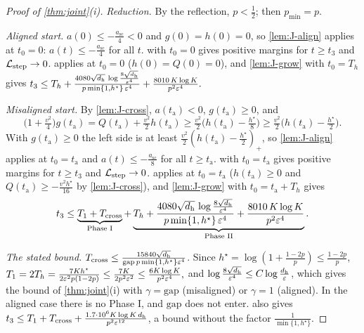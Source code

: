 \begin{proof}[Proof of \cref{thm:joint}(i)]
\emph{Reduction.} By the reflection, $p<\frac{1}{2}$; then $p_{\min}=p$.

\emph{Aligned start.} $a(0)\le-\frac{a_{\mathrm{sc}}}{4}<0$ and $g(0)=h(0)=0$, so \cref{lem:J-align} applies at $t_0=0$: $a(t)\le-\frac{a_{\mathrm{sc}}}{4}$ for all $t$.
 with $t_0=0$ gives positive margins for $t\ge t_3$ and $\mathcal L_{\mathrm{step}}\to0$.  applies at $t_0=0$ ($h(0)=Q(0)=0$), and
\cref{lem:J-grow} with $t_0=T_h$ gives
 $t_3\le T_h+\frac{4080\sqrt{d_{\mathrm h}}\,\log\frac{8\sqrt{d_{\mathrm h}}}{\varepsilon^4}}{p\min\{1,h^\star\}\,\varepsilon^4}+\frac{8010\,K\log K}{p^2\varepsilon^4} .$ 

\emph{Misaligned start.} By \cref{lem:J-cross}, $a(t_{\mathrm a})<0$, $g(t_{\mathrm a})\ge0$, and
\[
 \bigl(1+\tfrac{v^2}{4}\bigr)g(t_{\mathrm a})=Q(t_{\mathrm a})+\tfrac{v^2}{2}h(t_{\mathrm a})\ge\tfrac{v^2}{2}\bigl(h(t_{\mathrm a})-\tfrac{h^\star}{8}\bigr)\ge\tfrac{v^2}{2}\bigl(h(t_{\mathrm a})-\tfrac{h^\star}{2}\bigr).
\]
With $g(t_{\mathrm a})\ge0$ the left side is at least $\frac{v^2}{2}(h(t_{\mathrm a})-\frac{h^\star}{2})_+$, so \cref{lem:J-align} applies at $t_0=t_{\mathrm a}$ and $a(t)\le-\frac{a_{\mathrm{sc}}}{8}$ for all $t\ge t_{\mathrm a}$.  with $t_0=t_{\mathrm a}$ gives positive margins for $t\ge t_3$ and $\mathcal L_{\mathrm{step}}\to0$. 
applies at $t_0=t_{\mathrm a}$ ($h(t_{\mathrm a})\ge0$ and $Q(t_{\mathrm a})\ge-\frac{v^2h^\star}{16}$ by \cref{lem:J-cross}), and \cref{lem:J-grow} with $t_0=t_{\mathrm a}+T_h$ gives
\[
 t_3\le\underbrace{T_1+T_{\mathrm{cross}}}_{\text{Phase I}}+\underbrace{T_h+\frac{4080\sqrt{d_{\mathrm h}}\,\log\frac{8\sqrt{d_{\mathrm h}}}{\varepsilon^4}}{p\min\{1,h^\star\}\,\varepsilon^4}+\frac{8010\,K\log K}{p^2\varepsilon^4}}_{\text{Phase II}} .
\]

\emph{The stated bound.} $T_{\mathrm{cross}}\le\frac{15840\sqrt{d_{\mathrm h}}}{\mathrm{gap}\,p\min\{1,h^\star\}\varepsilon^4}$. Since $h^\star=\log(1+\frac{1-2p}{p})\le\frac{1-2p}{p}$,
 $T_1=2T_h=\frac{7Kh^\star}{2\varepsilon^2p(1-2p)}\le\frac{7K}{2p^2\varepsilon^2}\le\frac{6K\log K}{p^2\varepsilon^4},$ 
and $\log\frac{8\sqrt{d_{\mathrm h}}}{\varepsilon^4}\le C\log\frac{d_{\mathrm h}}{\varepsilon}$, which gives the bound of \cref{thm:joint}(i) with $\gamma=\mathrm{gap}$ (misaligned) or $\gamma=1$ (aligned). In the
aligned case there is no Phase I, and $\mathrm{gap}$ does not enter.  also gives $t_3\le T_1+T_{\mathrm{cross}}+\frac{1.7\cdot10^6K\log K\,d_{\mathrm h}}{p^2\varepsilon^{12}}$, a bound
without the factor $\frac{1}{\min\{1,h^\star\}}$.


\end{proof}
